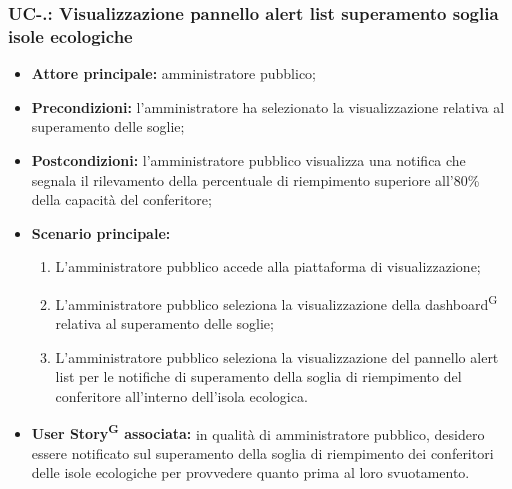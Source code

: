 \documentclass[8pt]{article}
\newcommand{\glossterm}[1]{#1\textsuperscript{G}} %
\begin{document}
\subsubsection*{UC-\theuc .\speconenumber: Visualizzazione pannello alert list superamento soglia isole ecologiche}
\begin{itemize}
    \item \textbf{Attore principale:} amministratore pubblico;
    \item \textbf{Precondizioni:} l'amministratore ha selezionato la visualizzazione relativa al superamento delle soglie;
    \item \textbf{Postcondizioni:} l’amministratore pubblico visualizza una notifica che segnala il rilevamento della percentuale di riempimento superiore all'80\% della capacità del conferitore;
    \item \textbf{Scenario principale:}
        \begin{enumerate}
        \item L’amministratore pubblico accede alla piattaforma di visualizzazione;
        \item L’amministratore pubblico seleziona la visualizzazione della \glossterm{dashboard} relativa al superamento delle soglie;
        \item L'amministratore pubblico seleziona la visualizzazione del pannello alert list per le notifiche di superamento della soglia di riempimento del conferitore all'interno dell'isola ecologica.
        \end{enumerate}
    \item \textbf{\glossterm{User Story} associata:} in qualità di amministratore pubblico, desidero essere notificato sul superamento della soglia di riempimento dei conferitori delle isole ecologiche per provvedere quanto prima al loro svuotamento.
\end{itemize}
\end{document}
